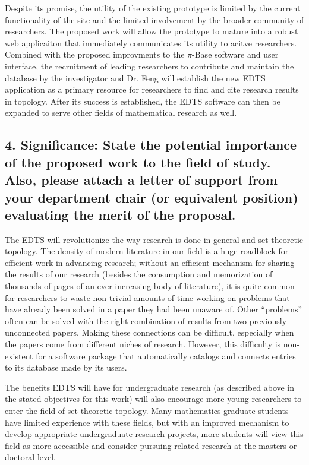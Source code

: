 \documentclass[10pt]{article}
\begin{document}
Despite its promise, the utility of the existing prototype is limited by the
current functionality of the site and the limited involvement by the broader
community of researchers. The proposed work will allow the prototype to
mature into a robust web applicaiton that immediately communicates its
utility to acitve researchers. Combined with the proposed improvments to the
\(\pi\)-Base software and user interface, the recruitment of leading
researchers to contribute and maintain the database by the investigator and
Dr. Feng will establish the new EDTS application as a primary resource for
researchers to find and cite research results in topology. After its
success is established, the EDTS software can then be expanded to serve other
fields of mathematical research as well.











\subsection*{4. Significance:  State the potential importance of the proposed work to the field of study.  Also, please attach a letter of support from your department chair (or equivalent position) evaluating the merit of the proposal.}

The EDTS will revolutionize the way research is done in general and
set-theoretic topology. The density of modern literature in our field is
a huge roadblock for efficient work in advancing research; without an efficient
mechanism for sharing the results of our research (besides the consumption
and memorization of thousands of pages of an ever-increasing body of
literature), it is quite common for
researchers to waste non-trivial amounts of time working on problems that
have already been solved in a paper they had been unaware of. Other ``problems''
often can be solved with the right combination of results from two previously
unconnected papers. Making these connections can be difficult, especially
when the papers come from different niches of research. However, this
difficulty is non-existent for a software package that automatically catalogs
and connects entries to its database made by its users.

The benefits EDTS will have for undergraduate research (as described above
in the stated objectives for this work) will also encourage more young
researchers to enter the field of set-theoretic topology. Many
mathematics graduate students have limited experience with these fields, but
with an improved mechanism to develop appropriate undergraduate research
projects, more students will view this field as more accessible and consider
pursuing related research at the masters or doctoral level.
\end{document}
